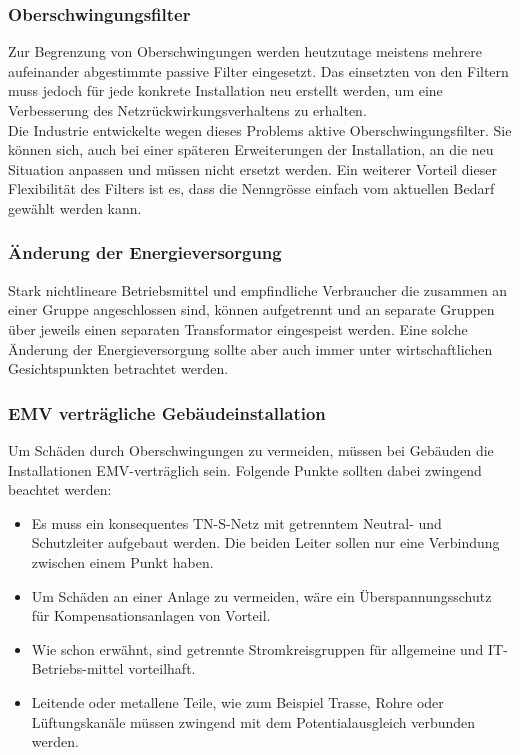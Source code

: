 \subsubsection*{Oberschwingungsfilter}
Zur Begrenzung von Oberschwingungen werden heutzutage  meistens mehrere aufeinander abgestimmte passive Filter eingesetzt. Das einsetzten von den Filtern muss jedoch für jede konkrete Installation neu erstellt werden, um eine Verbesserung des Netzrückwirkungsverhaltens zu erhalten.\\
Die Industrie entwickelte wegen dieses Problems aktive Oberschwingungsfilter. Sie können sich, auch bei einer späteren Erweiterungen der Installation, an die neu Situation anpassen und müssen nicht ersetzt werden. Ein weiterer Vorteil dieser Flexibilität des Filters ist es, dass die Nenngrösse einfach vom aktuellen Bedarf gewählt werden kann.     

\subsubsection*{Änderung der Energieversorgung}

Stark nichtlineare Betriebsmittel und empfindliche Verbraucher die zusammen an einer Gruppe angeschlossen sind, können aufgetrennt und an separate Gruppen über jeweils einen separaten Transformator eingespeist werden. Eine solche Änderung der Energieversorgung sollte aber auch immer unter wirtschaftlichen Gesichtspunkten betrachtet werden.

\subsubsection*{EMV verträgliche Gebäudeinstallation}

Um Schäden durch Oberschwingungen zu vermeiden, müssen bei Gebäuden die Installationen EMV-verträglich sein.
Folgende Punkte sollten dabei zwingend beachtet werden:

\begin{itemize}
	\item Es muss ein konsequentes TN-S-Netz mit getrenntem Neutral- und Schutzleiter aufgebaut werden. Die beiden Leiter sollen nur eine Verbindung zwischen einem Punkt haben.
	\item Um Schäden an einer Anlage zu vermeiden, wäre ein Überspannungsschutz für Kompensationsanlagen von Vorteil.
	\item Wie schon erwähnt, sind getrennte Stromkreisgruppen für allgemeine und IT-Betriebs-mittel vorteilhaft.
	\item Leitende oder metallene Teile, wie zum Beispiel Trasse, Rohre oder Lüftungskanäle müssen zwingend mit dem Potentialausgleich verbunden werden.
	
\end{itemize}

